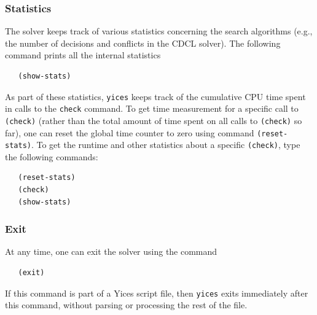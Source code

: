 \documentclass[11pt,twoside,fleqn,openright,titlepage]{cslreport}
\begin{document}
\subsubsection*{Statistics}

The solver keeps track of various statistics concerning the search
algorithms (e.g., the number of decisions and conflicts in the CDCL
solver). The following command prints all the internal statistics
\begin{small}
\begin{verbatim}
   (show-stats)
\end{verbatim}
\end{small}
As part of these statistics, \texttt{yices} keeps track of the
cumulative CPU time spent in calls to the \texttt{check} command.  To
get time measurement for a specific call to \texttt{(check)} (rather
than the total amount of time spent on all calls to \texttt{(check)}
so far), one can reset the global time counter to zero using command
\texttt{(reset-stats)}. To get the runtime and other statistics about
a specific \texttt{(check)}, type the following commands:
\begin{small}
\begin{verbatim}
   (reset-stats)
   (check)
   (show-stats)
\end{verbatim}
\end{small}

\subsubsection*{Exit}

At any time, one can exit the solver using the command
\begin{small}
\begin{verbatim}
   (exit)
\end{verbatim}
\end{small}
If this command is part of a Yices script file, then \texttt{yices}
exits immediately after this command, without parsing or processing the
rest of the file.







\end{document}
